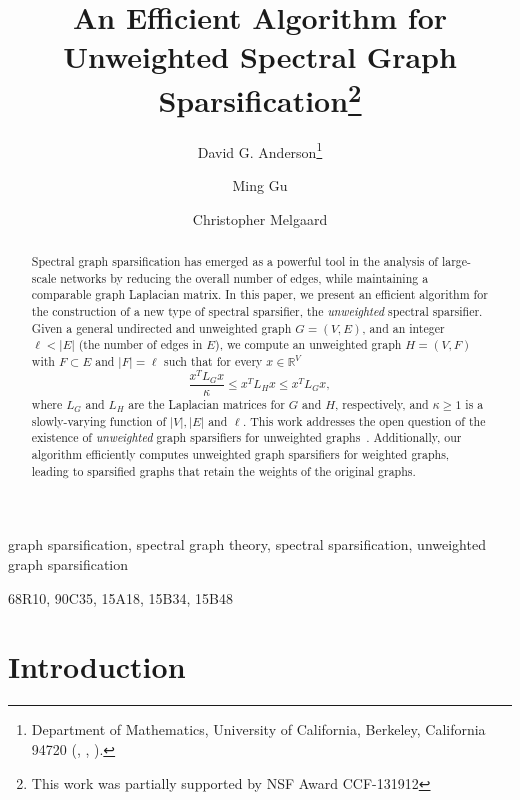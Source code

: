 \documentclass[final,leqno,onefignum,onetabnum]{siamltex1213}
\title{An Efficient Algorithm for Unweighted Spectral Graph Sparsification\thanks{This work was partially supported by NSF Award CCF-131912}}
\author{David G. Anderson\thanks{Department of Mathematics, University of California, Berkeley, California 94720 (\email{anderson@math.berkeley.edu}, \email{mgu@math.berkeley.edu}, \email{melgaard@math.berkeley.edu}).} \and Ming Gu\footnotemark[2] \and Christopher Melgaard\footnotemark[2]}
\begin{document}
\maketitle
{}

\begin{abstract}
Spectral graph sparsification has emerged as a powerful
tool in the analysis of large-scale networks by reducing the overall
number of edges, while maintaining a comparable graph Laplacian
matrix. In this paper, we present an efficient algorithm for the
construction of a new type of spectral sparsifier, the
\emph{unweighted} spectral sparsifier. Given a general undirected and unweighted
graph $G = \left( V, E \right)$, and an integer $\ell < |E|$ (the
number of edges in $E$), we compute an unweighted graph $H = \left( V,
F \right)$ with $F \subset E$ and $|F| = \ell$ such that for every $x \in \mathbb{R}^{V}$ 
\[
{\displaystyle \frac{x^T L_G x}{\kappa} \leq x^T L_H x \leq x^T L_G
x,} \] 
where $L_G$ and $L_H$ are the Laplacian matrices for $G$ and $H$,
respectively, and $\kappa \geq 1$ is a slowly-varying
function of $|V|, |E|$ and $\ell$. This work addresses the
open question of the existence of \emph{unweighted} graph
sparsifiers for unweighted
graphs~\cite{ramanujansparse}.  Additionally, our algorithm efficiently computes
unweighted graph sparsifiers for weighted graphs, leading to
sparsified graphs that retain the weights of the original graphs.
\end{abstract}

\begin{keywords}graph sparsification, spectral graph theory, spectral sparsification, unweighted graph sparsification\end{keywords}

\begin{AMS} 68R10, 90C35, 15A18, 15B34, 15B48\end{AMS}


\pagestyle{myheadings}
\thispagestyle{plain}

\section{Introduction}
\end{document}
